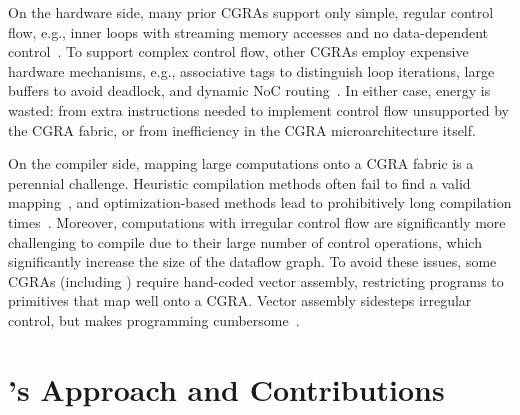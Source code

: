 On the hardware side,
%
many prior CGRAs support only simple, regular control flow,
e.g., inner loops with streaming memory accesses
and no data-dependent control~\cite{plasticine,nowatzki:isca17:stream-dataflow,snafu}.
%
To support complex control flow, other CGRAs employ expensive hardware mechanisms, e.g.,
associative tags to distinguish loop iterations,
large buffers to avoid deadlock,
and dynamic NoC routing~\cite{monsoon,ttda,swanson2003wavescalar,voitsechov2014single}.
%
%
In either case, energy is wasted:
%
from extra instructions needed to implement control flow unsupported
by the CGRA fabric,
%
or from inefficiency in the CGRA microarchitecture itself.


On the compiler side, mapping large computations onto a CGRA fabric is a 
perennial challenge.
%
Heuristic compilation methods often fail to find a valid
mapping~\cite{chlorophyll,nowatzki2018hybrid}, and optimization-based methods lead to
prohibitively long compilation times~\cite{nowatzki2018hybrid,cgrame-ilp}.
%
Moreover, computations with irregular control flow are significantly
more challenging to compile due to their large number of control
operations, which significantly increase the size of the dataflow
graph.
%
To avoid these issues, some CGRAs (including \snafu) require
hand-coded vector assembly, restricting programs to
primitives that map well onto a CGRA.
%
Vector assembly sidesteps irregular control,
but makes programming cumbersome~\cite{snafu,yang2021spzip,nowatzki:isca17:stream-dataflow}.


\section*{\riptide's Approach and Contributions}

